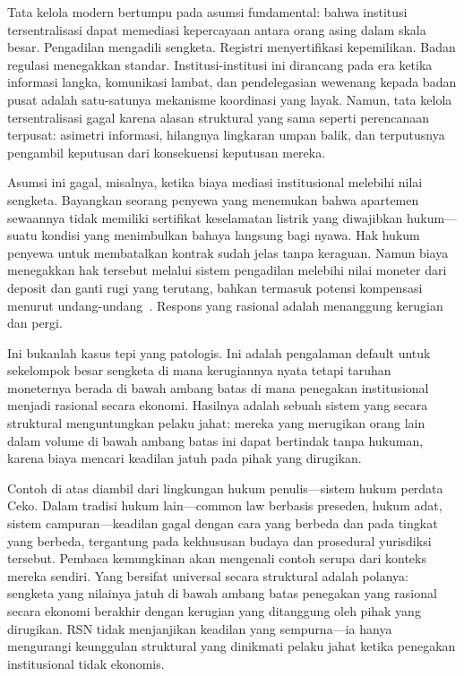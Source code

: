 \documentclass[11pt,a4paper,twocolumn]{article}
\begin{document}
Tata kelola modern bertumpu pada asumsi fundamental: bahwa institusi tersentralisasi dapat memediasi kepercayaan antara orang asing dalam skala besar. Pengadilan mengadili sengketa. Registri menyertifikasi kepemilikan. Badan regulasi menegakkan standar. Institusi-institusi ini dirancang pada era ketika informasi langka, komunikasi lambat, dan pendelegasian wewenang kepada badan pusat adalah satu-satunya mekanisme koordinasi yang layak. Namun, tata kelola tersentralisasi gagal karena alasan struktural yang sama seperti perencanaan terpusat: asimetri informasi, hilangnya lingkaran umpan balik, dan terputusnya pengambil keputusan dari konsekuensi keputusan mereka.

Asumsi ini gagal, misalnya, ketika biaya mediasi institusional melebihi nilai sengketa. Bayangkan seorang penyewa yang menemukan bahwa apartemen sewaannya tidak memiliki sertifikat keselamatan listrik yang diwajibkan hukum---suatu kondisi yang menimbulkan bahaya langsung bagi nyawa. Hak hukum penyewa untuk membatalkan kontrak sudah jelas tanpa keraguan. Namun biaya menegakkan hak tersebut melalui sistem pengadilan melebihi nilai moneter dari deposit dan ganti rugi yang terutang, bahkan termasuk potensi kompensasi menurut undang-undang~\cite{czcourtfees}. Respons yang rasional adalah menanggung kerugian dan pergi.

Ini bukanlah kasus tepi yang patologis. Ini adalah pengalaman default untuk sekelompok besar sengketa di mana kerugiannya nyata tetapi taruhan moneternya berada di bawah ambang batas di mana penegakan institusional menjadi rasional secara ekonomi. Hasilnya adalah sebuah sistem yang secara struktural menguntungkan pelaku jahat: mereka yang merugikan orang lain dalam volume di bawah ambang batas ini dapat bertindak tanpa hukuman, karena biaya mencari keadilan jatuh pada pihak yang dirugikan.

Contoh di atas diambil dari lingkungan hukum penulis---sistem hukum perdata Ceko. Dalam tradisi hukum lain---common law berbasis preseden, hukum adat, sistem campuran---keadilan gagal dengan cara yang berbeda dan pada tingkat yang berbeda, tergantung pada kekhususan budaya dan prosedural yurisdiksi tersebut. Pembaca kemungkinan akan mengenali contoh serupa dari konteks mereka sendiri. Yang bersifat universal secara struktural adalah polanya: sengketa yang nilainya jatuh di bawah ambang batas penegakan yang rasional secara ekonomi berakhir dengan kerugian yang ditanggung oleh pihak yang dirugikan. RSN tidak menjanjikan keadilan yang sempurna---ia hanya mengurangi keunggulan struktural yang dinikmati pelaku jahat ketika penegakan institusional tidak ekonomis.
\end{document}
